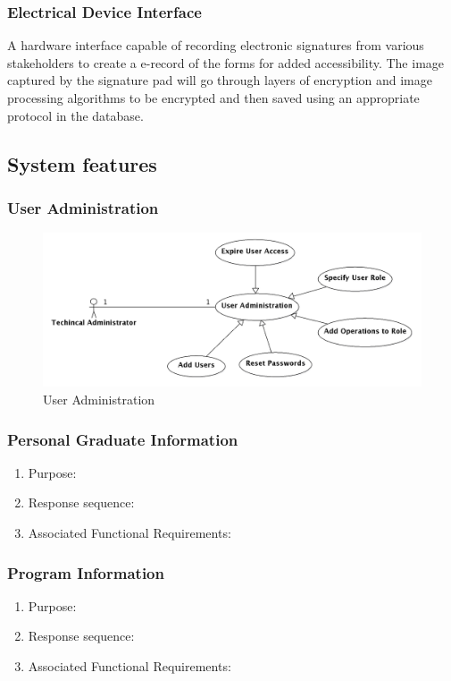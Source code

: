 \documentclass{journal}
\begin{document}
\subsubsection{ Electrical Device Interface }
A hardware interface capable of recording electronic signatures from various stakeholders to create a e-record of the forms for added accessibility. The image captured by the signature pad will go through layers of encryption and image processing algorithms to be encrypted and then saved using an appropriate protocol in the database.



\subsection{System features}
\subsubsection{User Administration}

\begin{figure}[!h]
\begin{center}
\includegraphics[width=440px]{diagrams/use_cases/TechAdmin_uc.png} \caption{ User Administration } \label{fig:UsersAdmin}

\end{center}
\end{figure}




\subsubsection{Personal Graduate Information}
\begin{enumerate}
\item Purpose:
\item Response sequence:
\item Associated Functional Requirements:
\end{enumerate}

\subsubsection{Program Information}
\begin{enumerate}
\item Purpose:
\item Response sequence:
\item Associated Functional Requirements:
\end{enumerate}
\end{document}
